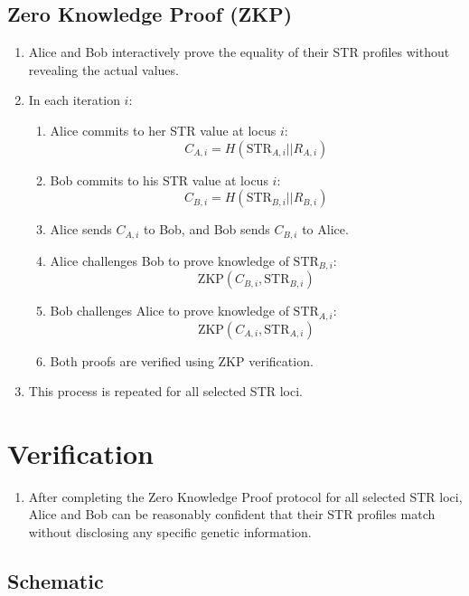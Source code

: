 \documentclass{article}
\begin{document}
\subsection{Zero Knowledge Proof (ZKP)}

\begin{enumerate}
    \item Alice and Bob interactively prove the equality of their STR profiles without revealing the actual values.
    \item In each iteration $i$:
        \begin{enumerate}
            \item Alice commits to her STR value at locus $i$:
                \[ C_{A,i} = H(\text{STR}_{A,i} || R_{A,i}) \]
            \item Bob commits to his STR value at locus $i$:
                \[ C_{B,i} = H(\text{STR}_{B,i} || R_{B,i}) \]
            \item Alice sends $C_{A,i}$ to Bob, and Bob sends $C_{B,i}$ to Alice.
            \item Alice challenges Bob to prove knowledge of $\text{STR}_{B,i}$:
                \[ \text{ZKP}(C_{B,i}, \text{STR}_{B,i}) \]
            \item Bob challenges Alice to prove knowledge of $\text{STR}_{A,i}$:
                \[ \text{ZKP}(C_{A,i}, \text{STR}_{A,i}) \]
            \item Both proofs are verified using ZKP verification.
        \end{enumerate}
    \item This process is repeated for all selected STR loci.
\end{enumerate}

\section{Verification}

\begin{enumerate}
    \item After completing the Zero Knowledge Proof protocol for all selected STR loci, Alice and Bob can be reasonably confident that their STR profiles match without disclosing any specific genetic information.
\end{enumerate}

\subsection{Schematic}
\end{document}
